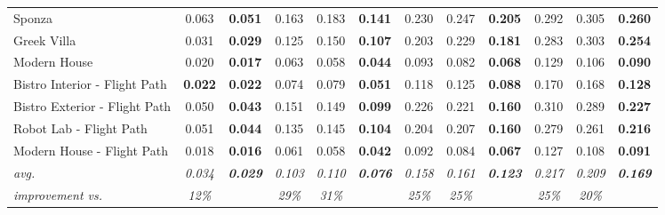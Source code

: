 \begin{table*}[t]
\begin{tabular}{l cc | ccc | ccc | ccc}
Sponza                        & 0.063          & \textbf{0.051}          & 0.163             & 0.183          & \textbf{0.141}          & 0.230             & 0.247          & \textbf{0.205}          & 0.292             & 0.305          & \textbf{0.260}          \\
Greek Villa                   & 0.031          & \textbf{0.029}          & 0.125             & 0.150          & \textbf{0.107}          & 0.203             & 0.229          & \textbf{0.181}          & 0.283             & 0.303          & \textbf{0.254}          \\
Modern House                  & 0.020          & \textbf{0.017}          & 0.063             & 0.058          & \textbf{0.044}          & 0.093             & 0.082          & \textbf{0.068}          & 0.129             & 0.106          & \textbf{0.090}          \\
Bistro Interior - Flight Path & \textbf{0.022} & \textbf{0.022}          & 0.074             & 0.079          & \textbf{0.051}          & 0.118             & 0.125          & \textbf{0.088}          & 0.170             & 0.168          & \textbf{0.128}          \\
Bistro Exterior - Flight Path & 0.050          & \textbf{0.043}          & 0.151             & 0.149          & \textbf{0.099}          & 0.226             & 0.221          & \textbf{0.160}          & 0.310             & 0.289          & \textbf{0.227}          \\
Robot Lab - Flight Path       & 0.051          & \textbf{0.044}          & 0.135             & 0.145          & \textbf{0.104}          & 0.204             & 0.207          & \textbf{0.160}          & 0.279             & 0.261          & \textbf{0.216}          \\
Modern House - Flight Path    & 0.018          & \textbf{0.016}          & 0.061             & 0.058          & \textbf{0.042}          & 0.092             & 0.084          & \textbf{0.067}          & 0.127             & 0.108          & \textbf{0.091}          \\
\hline
\textit{avg.}                 & \textit{0.034} & \textit{\textbf{0.029}} & \textit{0.103}    & \textit{0.110} & \textit{\textbf{0.076}} & \textit{0.158}    & \textit{0.161} & \textit{\textbf{0.123}} & \textit{0.217}    & \textit{0.209} & \textit{\textbf{0.169}} \\
\textit{improvement vs.}      & \textit{12\%}  &                         & \textit{29\%}     & \textit{31\%}  &                         & \textit{25\%}     & \textit{25\%}  &                         & \textit{25\%}     & \textit{20\%}  &                         \\

\end{tabular}
\end{table*}
